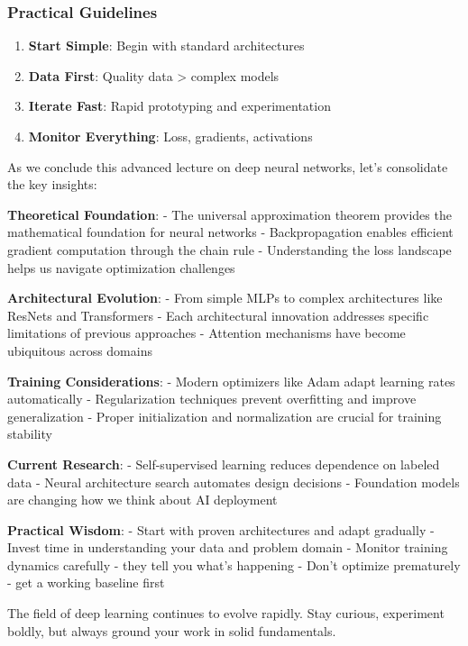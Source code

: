 \documentclass[
  11pt,
  letterpaper,
]{article}
\providecommand{\tightlist}{%
  \setlength{\itemsep}{0pt}\setlength{\parskip}{0pt}}
\begin{document}
\subsubsection{Practical Guidelines}\label{practical-guidelines}

\begin{enumerate}
\def\labelenumi{\arabic{enumi}.}
\tightlist
\item
  \textbf{Start Simple}: Begin with standard architectures
\item
  \textbf{Data First}: Quality data \textgreater{} complex models
\item
  \textbf{Iterate Fast}: Rapid prototyping and experimentation
\item
  \textbf{Monitor Everything}: Loss, gradients, activations
\end{enumerate}

As we conclude this advanced lecture on deep neural networks, let's
consolidate the key insights:

\textbf{Theoretical Foundation}: - The universal approximation theorem
provides the mathematical foundation for neural networks -
Backpropagation enables efficient gradient computation through the chain
rule - Understanding the loss landscape helps us navigate optimization
challenges

\textbf{Architectural Evolution}: - From simple MLPs to complex
architectures like ResNets and Transformers - Each architectural
innovation addresses specific limitations of previous approaches -
Attention mechanisms have become ubiquitous across domains

\textbf{Training Considerations}: - Modern optimizers like Adam adapt
learning rates automatically - Regularization techniques prevent
overfitting and improve generalization - Proper initialization and
normalization are crucial for training stability

\textbf{Current Research}: - Self-supervised learning reduces dependence
on labeled data - Neural architecture search automates design decisions
- Foundation models are changing how we think about AI deployment

\textbf{Practical Wisdom}: - Start with proven architectures and adapt
gradually - Invest time in understanding your data and problem domain -
Monitor training dynamics carefully - they tell you what's happening -
Don't optimize prematurely - get a working baseline first

The field of deep learning continues to evolve rapidly. Stay curious,
experiment boldly, but always ground your work in solid fundamentals.
\end{document}
